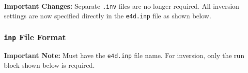 \documentclass[a4paper,12pt]{article}
\begin{document}
\begin{framed}
    \noindent \textbf{Important Changes:} Separate \texttt{.inv} files are no longer required. All inversion settings are now specified directly in the \texttt{e4d.inp} file as shown below.
\end{framed}

\subsubsection{\texttt{inp} File Format} \label{inversion_inp}

\begin{framed}
    \noindent \textbf{Important Note:} Must have the \texttt{e4d.inp} file name. For inversion, only the run block shown below is required.
\end{framed}
\end{document}
